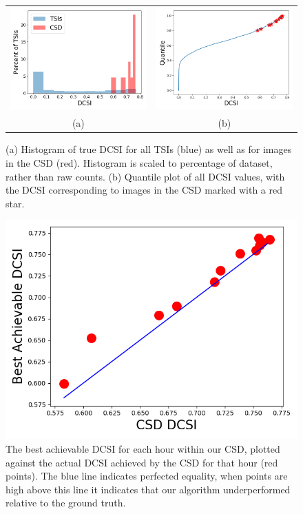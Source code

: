 \documentclass{article}
\begin{document}
\begin{figure}[h]
    \centering
    \begin{tabular}{cc}
    \includegraphics[width=.5\textwidth]{Figures/csd_dcsi_hist.png} & \includegraphics[width=.5\textwidth]{Figures/csd_dcsi_quants.png}  \\
       (a)  & (b) \\
    \end{tabular}
    \caption{(a) Histogram of true DCSI for all TSIs (blue) as well as for images in the CSD (red). Histogram is scaled to percentage of dataset, rather than raw counts. (b) Quantile plot of all DCSI values, with the DCSI corresponding to images in the CSD marked with a red star.}
    \label{fig:dcsi_hist}
\end{figure}

\begin{figure}[h]
    \centering
    \includegraphics[scale=.7]{Figures/csd_dcsi_perf.png}
    \caption{The best achievable DCSI for each hour within our CSD, plotted against the actual DCSI achieved by the CSD for that hour (red points). The blue line indicates perfected equality, when points are high above this line it indicates that our algorithm underperformed relative to the ground truth.}
    \label{fig:dcsi_perf}
\end{figure}
\end{document}
